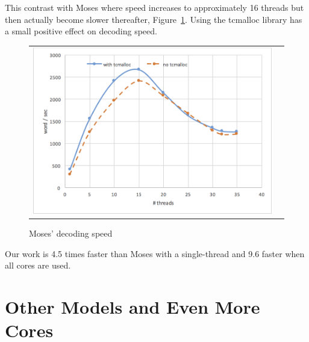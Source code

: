 \documentclass[11pt]{article}
\begin{document}
This contrast with Moses where speed increases to approximately 16 threads but then actually become slower thereafter, Figure~\ref{fig:moses-speed}. Using the tcmalloc library has a small positive effect on decoding speed. 
\begin{figure}[h]
\centering
\begin{tabular}{cc}
{\includegraphics[scale=0.4]{moses-scalability.png}} 
\end{tabular}
\caption{Moses' decoding speed}
\label{fig:moses-speed}
\end{figure} 


Our work is 4.5 times faster than Moses with a single-thread and 9.6 faster when all cores are used.

 

\section{Other Models and Even More Cores}
\end{document}

